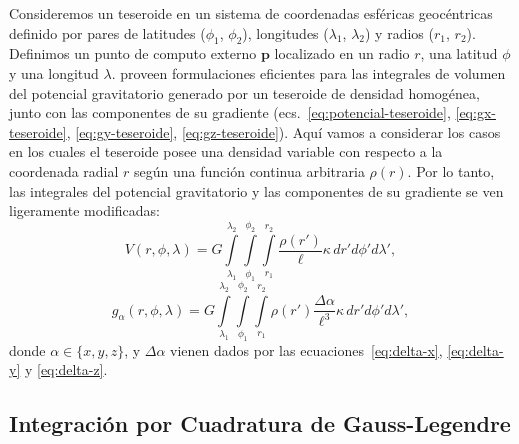 Consideremos un teseroide en un sistema de coordenadas esféricas geocéntricas
definido por pares de latitudes ($\phi_1$, $\phi_2$), longitudes ($\lambda_1$,
$\lambda_2$) y radios ($r_1$, $r_2$).
Definimos un punto de computo externo $\mathbf{p}$ localizado en un radio $r$,
una latitud $\phi$ y una longitud $\lambda$.
\citet{grombein2013} proveen formulaciones eficientes para las integrales de
volumen del potencial gravitatorio generado por un teseroide de densidad
homogénea, junto con las componentes de su gradiente
(ecs.~\ref{eq:potencial-teseroide}, \ref{eq:gx-teseroide},
\ref{eq:gy-teseroide}, \ref{eq:gz-teseroide}).
Aquí vamos a considerar los casos en los cuales el teseroide posee una
densidad variable con respecto a la coordenada radial $r$ según una función
continua arbitraria $\rho(r)$.
Por lo tanto, las integrales del potencial gravitatorio y las componentes de su
gradiente se ven ligeramente modificadas:
%
\begin{equation}
    V(r,\phi,\lambda) = G
    \int\limits_{\lambda_1}^{\lambda_2}
    \int\limits_{\phi_1}^{\phi_2}
    \int\limits_{r_1}^{r_2}
    \frac{\rho(r')}{\ell} \kappa \,  dr' d\phi' d\lambda',
\label{eq:tesseroid-pot}
\end{equation}
%
\begin{equation}
    g_{\alpha}(r,\phi,\lambda) = G
    \int\limits_{\lambda_1}^{\lambda_2}
    \int\limits_{\phi_1}^{\phi_2}
    \int\limits_{r_1}^{r_2}
    \rho(r') \frac{\Delta\alpha}{\ell^3}
    \kappa \, dr' d\phi' d\lambda',
\label{eq:tesseroid-grav}
\end{equation}
%
donde $\alpha \in \{x, y, z\}$, y $\Delta \alpha$ vienen dados por
las ecuaciones~\ref{eq:delta-x}, \ref{eq:delta-y} y \ref{eq:delta-z}.

\subsection{Integración por Cuadratura de Gauss-Legendre}

